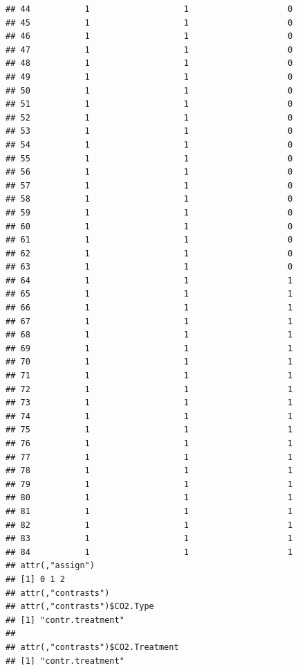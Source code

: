 \documentclass[
]{book}
\begin{document}
\begin{verbatim}
## 44           1                   1                    0
## 45           1                   1                    0
## 46           1                   1                    0
## 47           1                   1                    0
## 48           1                   1                    0
## 49           1                   1                    0
## 50           1                   1                    0
## 51           1                   1                    0
## 52           1                   1                    0
## 53           1                   1                    0
## 54           1                   1                    0
## 55           1                   1                    0
## 56           1                   1                    0
## 57           1                   1                    0
## 58           1                   1                    0
## 59           1                   1                    0
## 60           1                   1                    0
## 61           1                   1                    0
## 62           1                   1                    0
## 63           1                   1                    0
## 64           1                   1                    1
## 65           1                   1                    1
## 66           1                   1                    1
## 67           1                   1                    1
## 68           1                   1                    1
## 69           1                   1                    1
## 70           1                   1                    1
## 71           1                   1                    1
## 72           1                   1                    1
## 73           1                   1                    1
## 74           1                   1                    1
## 75           1                   1                    1
## 76           1                   1                    1
## 77           1                   1                    1
## 78           1                   1                    1
## 79           1                   1                    1
## 80           1                   1                    1
## 81           1                   1                    1
## 82           1                   1                    1
## 83           1                   1                    1
## 84           1                   1                    1
## attr(,"assign")
## [1] 0 1 2
## attr(,"contrasts")
## attr(,"contrasts")$CO2.Type
## [1] "contr.treatment"
## 
## attr(,"contrasts")$CO2.Treatment
## [1] "contr.treatment"
\end{verbatim}
\end{document}

